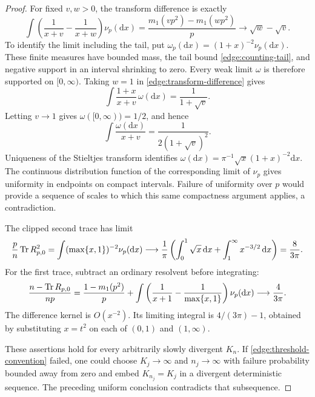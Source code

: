 \begin{proof}
For fixed \(v,w>0\), the transform difference is exactly
\begin{equation}\label{edge:transform-difference}
 \int\left(\frac1{x+v}-\frac1{x+w}\right)\nu_p(\mathrm dx)
 =\frac{m_1(vp^2)-m_1(wp^2)}p
 \longrightarrow\sqrt w-\sqrt v.
\end{equation}
To identify the limit including the tail, put
\(\omega_p(\mathrm dx)=(1+x)^{-2}\nu_p(\mathrm dx)\).
These finite measures have bounded mass, the tail bound
\eqref{edge:counting-tail}, and negative support in an interval shrinking
to zero.  Every weak limit \(\omega\) is therefore supported on
\([0,\infty)\).  Taking \(w=1\) in \eqref{edge:transform-difference} gives
\[
 \int\frac{1+x}{x+v}\,\omega(\mathrm dx)=\frac1{1+\sqrt v}.
\]
Letting \(v\to1\) gives \(\omega([0,\infty))=1/2\), and hence
\[
 \int\frac{\omega(\mathrm dx)}{x+v}
       =\frac1{2(1+\sqrt v)^2}.
\]
Uniqueness of the Stieltjes transform identifies
\(\omega(\mathrm dx)=\pi^{-1}\sqrt x(1+x)^{-2}\mathrm dx\).  The
continuous distribution function of the corresponding limit of
\(\nu_p\) gives uniformity in endpoints on compact intervals.  Failure
of uniformity over \(p\) would provide a sequence of scales to which
this same compactness argument applies, a contradiction.

The clipped second trace has limit
\[
 \frac p n\operatorname{Tr} R_{p,0}^2
 =\int(\max\{x,1\})^{-2}\nu_p(\mathrm dx)
 \longrightarrow
 \frac1\pi\left(\int_0^1\sqrt x\,\mathrm dx+
                 \int_1^\infty x^{-3/2}\,\mathrm dx\right)
 =\frac8{3\pi}.
\]
For the first trace, subtract an ordinary resolvent before integrating:
\[
 \frac{n-\operatorname{Tr} R_{p,0}}{np}
 =\frac{1-m_1(p^2)}p+
 \int\left(\frac1{x+1}-\frac1{\max\{x,1\}}\right)\nu_p(\mathrm dx)
 \longrightarrow\frac4{3\pi}.
\]
The difference kernel is \(O(x^{-2})\).  Its limiting integral is
\(4/(3\pi)-1\), obtained by substituting \(x=t^2\) on each of
\((0,1)\) and \((1,\infty)\).

These assertions hold for every arbitrarily slowly divergent \(K_n\).
If \eqref{edge:threshold-convention} failed, one could choose
\(K_j\to\infty\) and \(n_j\to\infty\) with failure probability bounded
away from zero and embed \(K_{n_j}=K_j\) in a divergent deterministic
sequence.  The preceding uniform conclusion contradicts that subsequence.
\end{proof}


